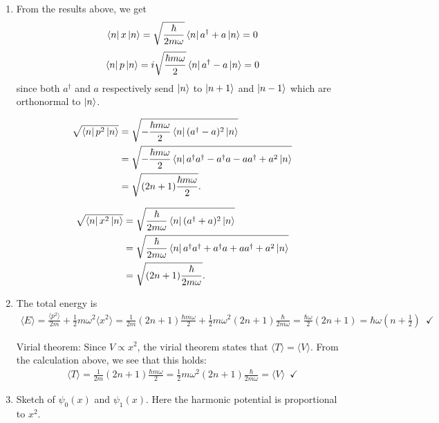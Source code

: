 \documentclass{article}
\theoremstyle{definition}
\newcommand{\f}[2]{\frac{#1}{#2}}
\newcommand{\lp}{\left(}
\newcommand{\rp}{\right)}
\begin{document}
\begin{enumerate}[label=\alph*)]
	\item From the results above, we get
	\begin{align*}
	\bra{n} x \ket{n} = \sqrt{\f{\hbar}{2 m\omega}}\bra{n} a^\dagger + a \ket{n} = 0
	\end{align*}
	\begin{align*}
	\bra{n} p \ket{n} = i\sqrt{\f{\hbar m\omega }{2}}\bra{n} a^\dagger - a \ket{n} = 0
	\end{align*}
	since both $a^\dagger$ and $a$ respectively send $\ket{n}$ to $\ket{n+1}$ and $\ket{n-1}$ which are orthonormal to $\ket{n}$. 
	
	
	\begin{align*}
	\sqrt{\bra{n}p^2 \ket{n}} &= \sqrt{-\f{\hbar m\omega}{2}\bra{n} (a^\dagger - a)^2 \ket{n} }\\
	&= \sqrt{-\f{\hbar m\omega}{2} \bra{n} a^\dagger a^\dagger -a^\dagger a - aa^\dagger + a^2 \ket{n} }\\
	&= \sqrt{(2n+1)\f{\hbar m\omega}{2}}.
	\end{align*}
	
	\begin{align*}
	\sqrt{\bra{n}x^2 \ket{n}} &= \sqrt{\f{\hbar}{2 m\omega}\bra{n} (a^\dagger + a)^2 \ket{n} }\\
	&= \sqrt{\f{\hbar}{2 m\omega}\bra{n} a^\dagger a^\dagger +a^\dagger a + aa^\dagger + a^2 \ket{n} }\\
	&= \sqrt{(2n+1)\f{\hbar}{2 m\omega}}.
	\end{align*}
	
	
	\item The total energy is 
	\begin{align*}
	\langle  E\rangle  = \f{\langle p^2\rangle }{2m} + \f{1}{2}m\omega^2 \langle x^2\rangle = \f{1}{2m} (2n+1)\f{\hbar m\omega}{2} + \f{1}{2}m\omega^2 (2n+1) \f{\hbar }{2m\omega} = \f{\hbar \omega}{2}(2n+1) = \hbar \omega\lp n+ \f{1}{2}\rp \,\,\, \checkmark
	\end{align*}
	
	Virial theorem: Since $V\propto x^2$, the virial theorem states that $\langle T \rangle  = \langle V \rangle$. From the calculation above, we see that this holds:
	\begin{align*}
	\langle T \rangle = \f{1}{2m} (2n+1)\f{\hbar m\omega}{2}  =  \f{1}{2}m\omega^2 (2n+1) \f{\hbar }{2m\omega} = \langle V \rangle \,\,\, \checkmark
	\end{align*}
	
	\item Sketch of $\psi_0(x)$ and $\psi_1(x)$. Here the harmonic potential is proportional to $x^2$. 
	

\end{enumerate}
\end{document}

